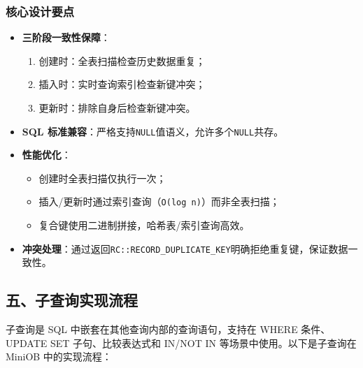 \documentclass[a4paper, 12pt]{article}
\begin{document}
\subsubsection*{核心设计要点}
\begin{itemize}
    \item \textbf{三阶段一致性保障}：
    \begin{enumerate}
        \item 创建时：全表扫描检查历史数据重复；
        \item 插入时：实时查询索引检查新键冲突；
        \item 更新时：排除自身后检查新键冲突。
    \end{enumerate}
    \item \textbf{SQL 标准兼容}：严格支持\texttt{NULL}值语义，允许多个\texttt{NULL}共存。
    \item \textbf{性能优化}：
    
\begin{itemize}
        \item 创建时全表扫描仅执行一次；
        \item 插入/更新时通过索引查询（\texttt{O(log n)}）而非全表扫描；
        \item 复合键使用二进制拼接，哈希表/索引查询高效。
    \end{itemize}
    \item \textbf{冲突处理}：通过返回\texttt{RC::RECORD\_DUPLICATE\_KEY}明确拒绝重复键，保证数据一致性。
\end{itemize}

\subsection{五、子查询实现流程}
子查询是 SQL 中嵌套在其他查询内部的查询语句，支持在 WHERE 条件、UPDATE SET 子句、比较表达式和 IN/NOT IN 等场景中使用。以下是子查询在 MiniOB 中的实现流程：
\end{document}
